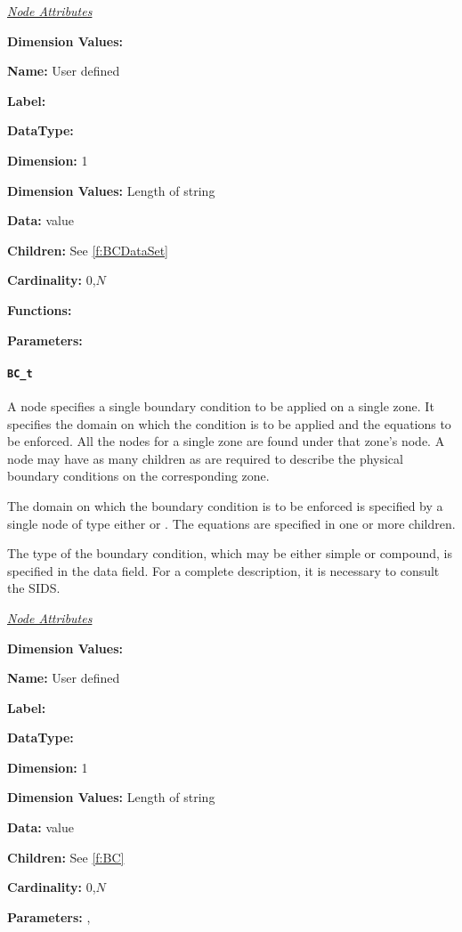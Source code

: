 \textit{\uline{Node Attributes}}
\begin{Ventryic}{\textbf{Dimension Values:}}
\item [\textbf{Name:}]
      User defined
\item [\textbf{Label:}]
\item [\textbf{DataType:}]
\item [\textbf{Dimension:}]
      1
\item [\textbf{Dimension Values:}]
      Length of string
\item [\textbf{Data:}]
       value
\item [\textbf{Children:}]
      See \autoref{f:BCDataSet}
\item [\textbf{Cardinality:}]
      0,$N$
\item [\textbf{Functions:}]
\item [\textbf{Parameters:}]
\end{Ventryic}

\paragraph{\texttt{BC\_t}}

A  node specifies a single boundary condition to be applied
on a single zone. It specifies the domain on which the condition is
to be applied and the equations to be enforced. All the 
nodes for a single zone are found under that zone's 
node. A  node may have as many  children
as are required to describe the physical boundary conditions on the
corresponding zone.

The domain on which the boundary condition is to be enforced is
specified by a single node of type either  or
. The equations are specified in one or
more  children.

The type of the boundary condition, which may be either simple or
compound, is specified in the data field.  For a complete description,
it is necessary to consult the SIDS.

\textit{\uline{Node Attributes}}
\begin{Ventryic}{\textbf{Dimension Values:}}
\item [\textbf{Name:}]
      User defined
\item [\textbf{Label:}]
\item [\textbf{DataType:}]
\item [\textbf{Dimension:}]
      1
\item [\textbf{Dimension Values:}]
      Length of string
\item [\textbf{Data:}]
       value
\item [\textbf{Children:}]
      See \autoref{f:BC}
\item [\textbf{Cardinality:}]
      0,$N$
\item [\textbf{Parameters:}]
      , 
\end{Ventryic}

